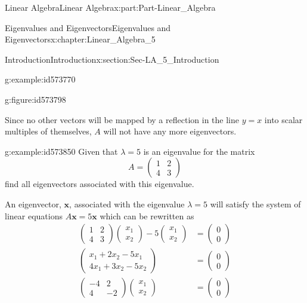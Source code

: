 \documentclass[oneside,10pt,]{book}
\numberwithin{equation}{section}
\newcommand{\amp}{&}
\begin{document}
\begin{partptx}{Linear Algebra}{}{Linear Algebra}{}{}{x:part:Part-Linear_Algebra}
\begin{chapterptx}{Eigenvalues and Eigenvectors}{}{Eigenvalues and Eigenvectors}{}{}{x:chapter:Linear_Algebra_5}
\begin{sectionptx}{Introduction}{}{Introduction}{}{}{x:section:Sec-LA_5_Introduction}
\begin{example}{}{g:example:id573770}
\begin{figureptx}{}{g:figure:id573798}{}
\begin{image}{0.125}{0.75}{0.125}
\end{image}%
\tcblower
\end{figureptx}%
 Since no other vectors will be mapped by a reflection in the line \(y=x\) into scalar multiples of themselves, \(A\) will not have any more eigenvectors.%
\end{example}
\begin{example}{}{g:example:id573850}%
Given that \(\lambda=5\) is an eigenvalue for the matrix%
\begin{equation*}
A=\begin{pmatrix} 1 \amp 2 \\ 4 \amp 3 \end{pmatrix}
\end{equation*}
find all eigenvectors associated with this eigenvalue.%
\par\smallskip%
\noindent\hypertarget{g:solution:id573840}{}An eigenvector, \(\mathbf{x}\), associated with the eigenvalue \(\lambda=5\) will satisfy the system of linear equations \(A\mathbf{x}=5\mathbf{x}\) which can be rewritten as%
\begin{align*}
\begin{pmatrix} 1 \amp 2 \\ 4 \amp 3 \end{pmatrix} \begin{pmatrix} x_1 \\ x_2 \end{pmatrix} -5\begin{pmatrix} x_1 \\ x_2 \end{pmatrix} \amp =\begin{pmatrix} 0 \\ 0 \end{pmatrix}\\
\begin{pmatrix} x_1+2x_2-5x_1 \\ 4x_1+3x_2-5x_2 \end{pmatrix} \amp =\begin{pmatrix} 0 \\ 0 \end{pmatrix}\\
\begin{pmatrix} -4 \amp 2 \\ 4 \amp -2 \end{pmatrix} \begin{pmatrix} x_1 \\ x_2 \end{pmatrix} \amp =\begin{pmatrix} 0 \\ 0 \end{pmatrix}

\end{align*}
\end{example}
\end{sectionptx}
\end{chapterptx}
\end{partptx}
\end{document}
